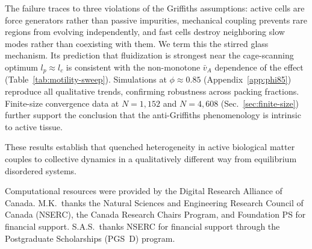 \documentclass[aps,pre,twocolumn,superscriptaddress,longbibliography,floatfix]{revtex4-2}
\begin{document}
The failure traces to three violations of the Griffiths assumptions:
active cells are force generators rather than passive impurities,
mechanical coupling prevents rare regions from evolving independently,
and fast cells destroy neighboring slow modes rather than coexisting
with them.  We term this the stirred glass mechanism.  Its prediction
that fluidization is strongest near the cage-scanning optimum
$l_p\!\approx\!l_c$ is consistent with the non-monotone $\bar{v}_A$
dependence of the effect (Table~\ref{tab:motility-sweep}).
Simulations at $\phi\!\approx\!0.85$ (Appendix~\ref{app:phi85})
reproduce all qualitative trends, confirming robustness across packing
fractions.  Finite-size convergence data at $N\!=\!1{,}152$ and
$N\!=\!4{,}608$ (Sec.~\ref{sec:finite-size}) further support the
conclusion that the anti-Griffiths phenomenology is intrinsic to
active tissue.

These results establish that quenched heterogeneity in active
biological matter couples to collective dynamics in a qualitatively
different way from equilibrium disordered systems.

\begin{acknowledgments}
Computational resources were provided by the Digital Research Alliance
of Canada.
M.K.\ thanks the Natural Sciences and Engineering Research Council of
Canada (NSERC), the Canada Research Chairs Program, and Foundation PS
for financial support.
S.A.S.\ thanks NSERC for financial support through the Postgraduate
Scholarships (PGS~D) program.
\end{acknowledgments}
\end{document}
